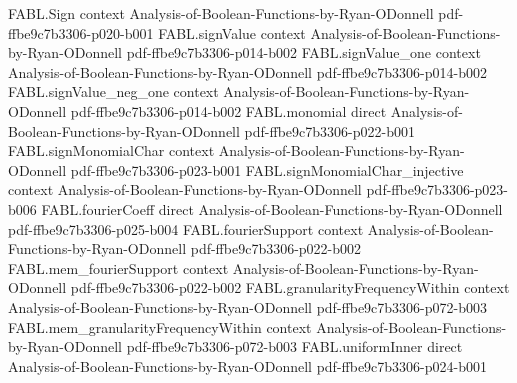\begin{theorem}
\label{FABL.FiniteFourierBasis.orthogonalDoobDifference_eq_sum_components}
\leanok
{}
\proofstep
  {FABL.Sign}
  {context}
  {Analysis-of-Boolean-Functions-by-Ryan-ODonnell}
  {pdf-ffbe9c7b3306-p020-b001}
\proofstep
  {FABL.signValue}
  {context}
  {Analysis-of-Boolean-Functions-by-Ryan-ODonnell}
  {pdf-ffbe9c7b3306-p014-b002}
\proofstep
  {FABL.signValue_one}
  {context}
  {Analysis-of-Boolean-Functions-by-Ryan-ODonnell}
  {pdf-ffbe9c7b3306-p014-b002}
\proofstep
  {FABL.signValue_neg_one}
  {context}
  {Analysis-of-Boolean-Functions-by-Ryan-ODonnell}
  {pdf-ffbe9c7b3306-p014-b002}
\proofstep
  {FABL.monomial}
  {direct}
  {Analysis-of-Boolean-Functions-by-Ryan-ODonnell}
  {pdf-ffbe9c7b3306-p022-b001}
\proofstep
  {FABL.signMonomialChar}
  {context}
  {Analysis-of-Boolean-Functions-by-Ryan-ODonnell}
  {pdf-ffbe9c7b3306-p023-b001}
\proofstep
  {FABL.signMonomialChar_injective}
  {context}
  {Analysis-of-Boolean-Functions-by-Ryan-ODonnell}
  {pdf-ffbe9c7b3306-p023-b006}
\proofstep
  {FABL.fourierCoeff}
  {direct}
  {Analysis-of-Boolean-Functions-by-Ryan-ODonnell}
  {pdf-ffbe9c7b3306-p025-b004}
\proofstep
  {FABL.fourierSupport}
  {context}
  {Analysis-of-Boolean-Functions-by-Ryan-ODonnell}
  {pdf-ffbe9c7b3306-p022-b002}
\proofstep
  {FABL.mem_fourierSupport}
  {context}
  {Analysis-of-Boolean-Functions-by-Ryan-ODonnell}
  {pdf-ffbe9c7b3306-p022-b002}
\proofstep
  {FABL.granularityFrequencyWithin}
  {context}
  {Analysis-of-Boolean-Functions-by-Ryan-ODonnell}
  {pdf-ffbe9c7b3306-p072-b003}
\proofstep
  {FABL.mem_granularityFrequencyWithin}
  {context}
  {Analysis-of-Boolean-Functions-by-Ryan-ODonnell}
  {pdf-ffbe9c7b3306-p072-b003}
\proofstep
  {FABL.uniformInner}
  {direct}
  {Analysis-of-Boolean-Functions-by-Ryan-ODonnell}
  {pdf-ffbe9c7b3306-p024-b001}

\end{theorem}
